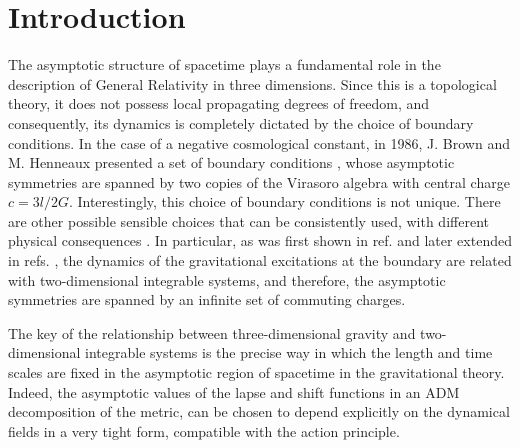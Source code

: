 \documentclass[letterpaper,11pt,oneside]{book}
\begin{document}
\newpage
\thispagestyle{plain}

\newpage

\mainmatter
\setcounter{page}{1}
\thispagestyle{plain}

\afterpage{\null\newpage}

\chapter*{Introduction}


The asymptotic structure of spacetime plays a fundamental role in
the description of General Relativity in three dimensions. Since this is a topological theory, it does not possess local propagating degrees of freedom, and consequently, its dynamics is completely dictated by the choice of boundary conditions. In the case of a negative cosmological constant, in 1986, J. Brown and M. Henneaux presented a set of boundary conditions \cite{Brown:1986nw}, whose asymptotic symmetries are spanned by two copies of the Virasoro algebra with central charge $c=3l/2G$. Interestingly, this choice of boundary conditions is not unique. There are other possible sensible choices that can be consistently used, with different physical consequences \cite{Compere:2013bya,Troessaert:2013fma,Avery:2013dja,Afshar:2016wfy,Perez:2016vqo,Grumiller:2016pqb,Ojeda:2019xih,Perez:2020klz}. In particular, as was first shown in ref. \cite{Perez:2016vqo} and later extended in refs. \cite{Fuentealba:2017omf, Ojeda:2019xih, Ojeda:2020bgz}, the dynamics of the gravitational excitations at the boundary are related with two-dimensional integrable systems, and therefore, the asymptotic symmetries are spanned by an infinite set of commuting charges.
 
The key of the relationship between three-dimensional gravity and
two-dimensional integrable systems is the precise way in which the
length and time scales are fixed in the asymptotic region of spacetime
in the gravitational theory. Indeed, the asymptotic values of the
lapse and shift functions in an ADM decomposition of the metric, can
be chosen to depend explicitly on the dynamical fields in a very tight
form, compatible with the action principle.
\end{document}

